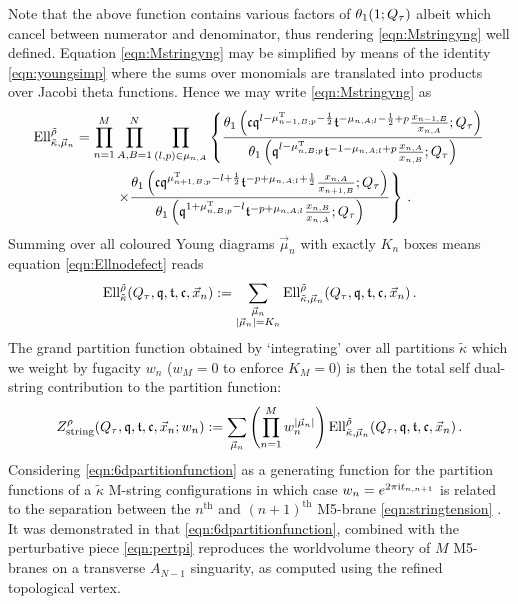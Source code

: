 \documentclass[main.tex]{subfiles}
\begin{document}
Note that the above function contains various factors of $\theta_1(1;Q_{\tau})$ albeit which cancel between numerator and denominator, thus rendering \eqref{eqn:Mstringyng} well defined. Equation \eqref{eqn:Mstringyng} may be simplified by means of the identity \eqref{eqn:youngsimp} where the sums over monomials are translated into products over Jacobi theta functions. Hence we may write \eqref{eqn:Mstringyng} as
\begin{equation}
\begin{aligned}
\textrm{Ell}^{\tilde{\rho}}_{\tilde{\kappa},\vec{\mu}_n}=\prod_{n=1}^M&\prod_{A,B=1}^{N}\prod_{(l,p)\in \mu_{{n,A}}}\left\{\frac{\theta_1\left(\mathfrak{c}\mathfrak{q}^{l-\mu_{n-1,B;p}^{\operatorname{T}}-\frac{1}{2}}\mathfrak{t}^{-\mu_{n,A;l}-\frac{1}{2}+p}\frac{x_{n-1,B}}{x_{n,A}};Q_{\tau}\right)}{\theta_1\left(\mathfrak{q}^{l-\mu_{n,B;p}^{\operatorname{T}}}\mathfrak{t}^{-1-\mu_{n,A;l}+p}\frac{x_{n,A}}{x_{n,B}};Q_{\tau}\right)}\right.\\
&\left.\times\frac{\theta_1\left(\mathfrak{c}\mathfrak{q}^{\mu^{\operatorname{T}}_{n+1,B;p}-l+\frac{1}{2}}\mathfrak{t}^{-p+\mu_{n,A;l}+\frac{1}{2}}\frac{x_{n,A}}{x_{n+1,B}};Q_{\tau}\right)}{\theta_1\left(\mathfrak{q}^{1+\mu^{\operatorname{T}}_{n,B;p}-l}\mathfrak{t}^{-p+\mu_{n,A;l}}\frac{x_{n,B}}{x_{n,A}};Q_{\tau}\right)}\right\}\,.\\
\end{aligned}
\end{equation}
Summing over all coloured Young diagrams $\vec{\mu}_n$ with exactly $K_n$ boxes means equation \eqref{eqn:Ellnodefect} reads
\begin{equation}\label{eqn:6dpartitionfunctionyng}
\textrm{Ell}^{\tilde{\rho}}_{\tilde{\kappa}}(Q_{\tau},\mathfrak{q},\mathfrak{t},\mathfrak{c},\vec{x}_{n}):=\sum_{\substack{\vec{\mu}_{n}\\|\vec{\mu}_n|=K_n}}\textrm{Ell}^{\tilde{\rho}}_{\tilde{\kappa},\vec{\mu}_n}(Q_{\tau},\mathfrak{q},\mathfrak{t},\mathfrak{c},\vec{x}_{n})\,.
\end{equation}
The grand partition function obtained by `integrating' over all partitions $\tilde{\kappa}$ which we weight by fugacity $w_n$ ($w_M=0$ to enforce $K_M=0$) is then the total self dual-string contribution to the partition function:
\begin{equation}\label{eqn:6dpartitionfunction}
Z^{\rho}_{\text{string}}(Q_{\tau},\mathfrak{q},\mathfrak{t},\mathfrak{c},\vec{x}_{n};w_n):=\sum_{\vec{\mu}_{n}}\left(\prod_{n=1}^Mw_{n}^{|\vec{\mu}_n|}\right)\textrm{Ell}^{\tilde{\rho}}_{\tilde{\kappa},\vec{\mu}_n}(Q_{\tau},\mathfrak{q},\mathfrak{t},\mathfrak{c},\vec{x}_{n})\,.
\end{equation}
Considering \eqref{eqn:6dpartitionfunction} as a generating function for the partition functions of a $\tilde{\kappa}$ M-string configurations in which case $w_n=e^{2\pi\mathrm{i} t_{n,n+1}}$ is related to the separation between the $n^{\text{th}}$ and $(n+1)^{\text{th}}$ M5-brane \eqref{eqn:stringtension} \cite{Haghighat:2013tka}. It was demonstrated in \cite{Haghighat:2013tka} that \eqref{eqn:6dpartitionfunction}, combined with the perturbative piece \eqref{eqn:pertpi} reproduces the worldvolume theory of $M$ M5-branes on a transverse $A_{N-1}$ singuarity, as computed using the refined topological vertex.
\end{document}

